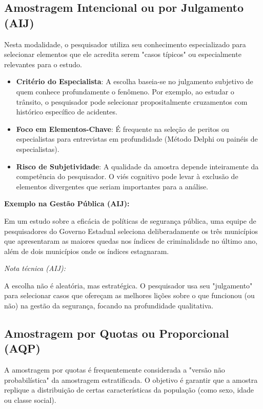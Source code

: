 \subsection{Amostragem Intencional ou por Julgamento (AIJ)}

Nesta modalidade, o pesquisador utiliza seu conhecimento especializado para selecionar elementos que ele acredita serem "casos típicos" ou especialmente relevantes para o estudo.

\begin{itemize}
    \item \textbf{Critério do Especialista}: A escolha baseia-se no julgamento subjetivo de quem conhece profundamente o fenômeno. Por exemplo, ao estudar o trânsito, o pesquisador pode selecionar propositalmente cruzamentos com histórico específico de acidentes.
    \item \textbf{Foco em Elementos-Chave}: É frequente na seleção de peritos ou especialistas para entrevistas em profundidade (Método Delphi ou painéis de especialistas).
    \item \textbf{Risco de Subjetividade}: A qualidade da amostra depende inteiramente da competência do pesquisador. O viés cognitivo pode levar à exclusão de elementos divergentes que seriam importantes para a análise.
\end{itemize}

\newpage
\textbf{Exemplo na Gestão Pública (AIJ):} \vskip0.3cm

Em um estudo sobre a eficácia de políticas de segurança pública, uma equipe de pesquisadores do Governo Estadual seleciona deliberadamente os três municípios que apresentaram as maiores quedas nos índices de criminalidade no último ano, além de dois municípios onde os índices estagnaram. \vskip0.3cm

\textit{Nota técnica (AIJ):} \vskip0.3cm

A escolha não é aleatória, mas estratégica. O pesquisador usa seu "julgamento" para selecionar casos que ofereçam as melhores lições sobre o que funcionou (ou não) na gestão da segurança, focando na profundidade qualitativa.


\subsection{Amostragem por Quotas ou Proporcional (AQP)}

A amostragem por quotas é frequentemente considerada a "versão não probabilística" da amostragem estratificada. O objetivo é garantir que a amostra replique a distribuição de certas características da população (como sexo, idade ou classe social).



